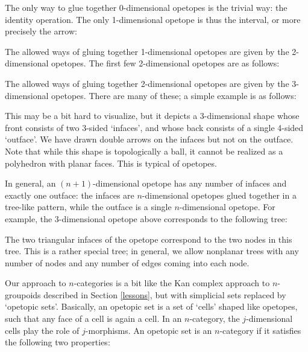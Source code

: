 \medskip
\centerline{\epsfysize=0.08in}
\medskip

\noindent The only way to glue together 0-dimensional opetopes is the
trivial way: the identity operation.  The only 1-dimensional opetope is
thus the interval, or more precisely the arrow:

\medskip
\centerline{\epsfysize=0.12in}
\medskip

\noindent The allowed ways of gluing together 1-dimensional opetopes are
given by the 2-dimensional opetopes.  The first few 2-dimensional
opetopes are as follows:

\medskip
\centerline{\epsfysize=0.8in}
\medskip

\noindent  The allowed ways of gluing together 2-dimensional opetopes are
given by the 3-dimensional opetopes.  There are many of these; a simple
example is as follows:

\medskip
\centerline{\epsfysize=1.2in}
\medskip

\noindent This may be a bit hard to visualize, but it depicts a
3-dimensional shape whose front consists of two 3-sided `infaces', and
whose back consists of a single 4-sided `outface'.  We have drawn double
arrows on the infaces but not on the outface.  Note that while this
shape is topologically a ball, it cannot be realized as a polyhedron
with planar faces.  This is typical of opetopes.   

In general, an $(n+1)$-dimensional opetope has any number of infaces and
exactly one outface: the infaces are $n$-dimensional opetopes glued
together in a tree-like pattern, while the outface is a single
$n$-dimensional opetope.  For example, the 3-dimensional opetope above
corresponds to the following tree:

\medskip
\centerline{\epsfysize=1.2in}
\medskip

\noindent The two triangular infaces of the opetope correspond to the
two nodes in this tree.  This is a rather special tree; in general, we
allow nonplanar trees with any number of nodes and any number of edges
coming into each node.

Our approach to $n$-categories is a bit like the Kan complex approach to
$n$-groupoids described in Section \ref{lessons}, but with simplicial
sets replaced by `opetopic sets'.  Basically, an opetopic set is a set
of `cells' shaped like opetopes, such that any face of a cell is again
a cell.  In an $n$-category, the $j$-dimensional cells play the role of
$j$-morphisms.  An opetopic set is an $n$-category if it satisfies
the following two properties:

